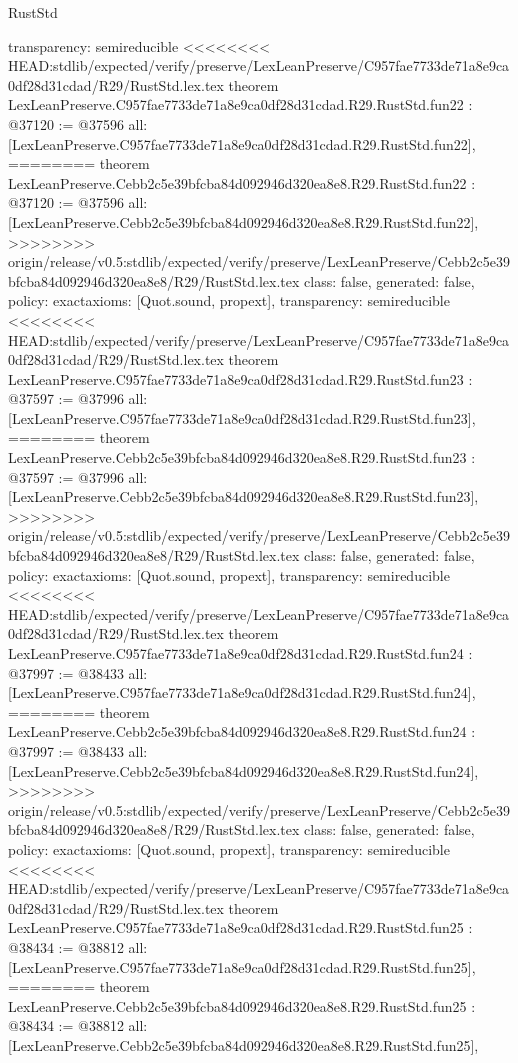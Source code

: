 \begin{lexlean}{RustStd}
\begin{coremodule}
{\begin{coremodule}
{{{{{{{{{{{{{{{{{{{{{{{{{  transparency: semireducible
}
<<<<<<<< HEAD:stdlib/expected/verify/preserve/LexLeanPreserve/C957fae7733de71a8e9ca0df28d31cdad/R29/RustStd.lex.tex
theorem LexLeanPreserve.C957fae7733de71a8e9ca0df28d31cdad.R29.RustStd.fun22 : @37120 := @37596 {
  all: [LexLeanPreserve.C957fae7733de71a8e9ca0df28d31cdad.R29.RustStd.fun22],
========
theorem LexLeanPreserve.Cebb2c5e39bfcba84d092946d320ea8e8.R29.RustStd.fun22 : @37120 := @37596 {
  all: [LexLeanPreserve.Cebb2c5e39bfcba84d092946d320ea8e8.R29.RustStd.fun22],
>>>>>>>> origin/release/v0.5:stdlib/expected/verify/preserve/LexLeanPreserve/Cebb2c5e39bfcba84d092946d320ea8e8/R29/RustStd.lex.tex
  class: false,
  generated: false,
  policy: exact{axioms: [Quot.sound, propext]},
  transparency: semireducible
}
<<<<<<<< HEAD:stdlib/expected/verify/preserve/LexLeanPreserve/C957fae7733de71a8e9ca0df28d31cdad/R29/RustStd.lex.tex
theorem LexLeanPreserve.C957fae7733de71a8e9ca0df28d31cdad.R29.RustStd.fun23 : @37597 := @37996 {
  all: [LexLeanPreserve.C957fae7733de71a8e9ca0df28d31cdad.R29.RustStd.fun23],
========
theorem LexLeanPreserve.Cebb2c5e39bfcba84d092946d320ea8e8.R29.RustStd.fun23 : @37597 := @37996 {
  all: [LexLeanPreserve.Cebb2c5e39bfcba84d092946d320ea8e8.R29.RustStd.fun23],
>>>>>>>> origin/release/v0.5:stdlib/expected/verify/preserve/LexLeanPreserve/Cebb2c5e39bfcba84d092946d320ea8e8/R29/RustStd.lex.tex
  class: false,
  generated: false,
  policy: exact{axioms: [Quot.sound, propext]},
  transparency: semireducible
}
<<<<<<<< HEAD:stdlib/expected/verify/preserve/LexLeanPreserve/C957fae7733de71a8e9ca0df28d31cdad/R29/RustStd.lex.tex
theorem LexLeanPreserve.C957fae7733de71a8e9ca0df28d31cdad.R29.RustStd.fun24 : @37997 := @38433 {
  all: [LexLeanPreserve.C957fae7733de71a8e9ca0df28d31cdad.R29.RustStd.fun24],
========
theorem LexLeanPreserve.Cebb2c5e39bfcba84d092946d320ea8e8.R29.RustStd.fun24 : @37997 := @38433 {
  all: [LexLeanPreserve.Cebb2c5e39bfcba84d092946d320ea8e8.R29.RustStd.fun24],
>>>>>>>> origin/release/v0.5:stdlib/expected/verify/preserve/LexLeanPreserve/Cebb2c5e39bfcba84d092946d320ea8e8/R29/RustStd.lex.tex
  class: false,
  generated: false,
  policy: exact{axioms: [Quot.sound, propext]},
  transparency: semireducible
}
<<<<<<<< HEAD:stdlib/expected/verify/preserve/LexLeanPreserve/C957fae7733de71a8e9ca0df28d31cdad/R29/RustStd.lex.tex
theorem LexLeanPreserve.C957fae7733de71a8e9ca0df28d31cdad.R29.RustStd.fun25 : @38434 := @38812 {
  all: [LexLeanPreserve.C957fae7733de71a8e9ca0df28d31cdad.R29.RustStd.fun25],
========
theorem LexLeanPreserve.Cebb2c5e39bfcba84d092946d320ea8e8.R29.RustStd.fun25 : @38434 := @38812 {
  all: [LexLeanPreserve.Cebb2c5e39bfcba84d092946d320ea8e8.R29.RustStd.fun25],
}}}}}}}}}}}}}}}}}}}}}}}}}}}}}
\end{coremodule}}
\end{coremodule}
\end{lexlean}
